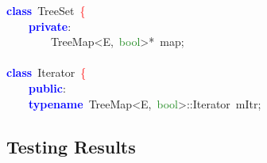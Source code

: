 \documentclass[table, usenames,dvipsnames,svgnames]{beamer}
\begin{document}
\begin{frame}
\pause
\vspace{-6mm}
\begin{center}\begin{minipage}{90mm}
\begin{block}
\noindent
\mbox{}\textbf{\textcolor{Blue}{class}}\ \textcolor{TealBlue}{TreeSet}\ \textcolor{Red}{\{} \\
\mbox{}\ \ \ \ \textbf{\textcolor{Blue}{private}}\textcolor{BrickRed}{:} \\
\mbox{}\ \ \ \ \ \ \ \ TreeMap\textcolor{BrickRed}{\textless{}}E\textcolor{BrickRed}{,}\ \textcolor{ForestGreen}{bool}\textcolor{BrickRed}{\textgreater{}*}\ map\textcolor{BrickRed}{;} \\
\mbox{} \\
\mbox{}\textbf{\textcolor{Blue}{class}}\ \textcolor{TealBlue}{Iterator}\ \textcolor{Red}{\{} \\
\mbox{}\ \ \ \ \textbf{\textcolor{Blue}{public}}\textcolor{BrickRed}{:} \\
\mbox{}\ \ \ \ \textbf{\textcolor{Blue}{typename}}\ \textcolor{TealBlue}{TreeMap}\textcolor{BrickRed}{\textless{}}E\textcolor{BrickRed}{,}\ \textcolor{ForestGreen}{bool}\textcolor{BrickRed}{\textgreater{}::}\textcolor{TealBlue}{Iterator}\ mItr\textcolor{BrickRed}{;}
\end{block}
\end{minipage}\end{center}

\end{frame}

\subsection{Testing Results}
\end{document}
